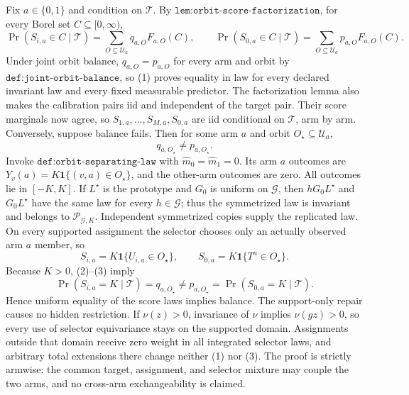 Fix \(a\in\{0,1\}\) and condition on \(\mathcal T\). By \(\texttt{lem:orbit-score-factorization}\), for every Borel set \(C\subseteq[0,\infty)\), \[\Pr(S_{i,a}\in C\mid\mathcal T)=\sum_{O\subseteq\mathcal U_a}q_{a,O}F_{a,O}(C),\qquad \Pr(S_{0,a}\in C\mid\mathcal T)=\sum_{O\subseteq\mathcal U_a}p_{a,O}F_{a,O}(C).\tag{1}\] Under joint orbit balance, \(q_{a,O}=p_{a,O}\) for every arm and orbit by \(\texttt{def:joint-orbit-balance}\), so (1) proves equality in law for every declared invariant law and every fixed measurable predictor. The factorization lemma also makes the calibration pairs iid and independent of the target pair. Their score marginals now agree, so \(S_{1,a},\ldots,S_{M,a},S_{0,a}\) are iid conditional on \(\mathcal T\), arm by arm.
Conversely, suppose balance fails. Then for some arm \(a\) and orbit \(O_\star\subseteq\mathcal U_a\), \[q_{a,O_\star}\ne p_{a,O_\star}.\tag{2}\] Invoke \(\texttt{def:orbit-separating-law}\) with \(\widehat m_0=\widehat m_1=0\). Its arm \(a\) outcomes are \(Y_v(a)=K\mathbf 1\{(v,a)\in O_\star\}\), and the other-arm outcomes are zero. All outcomes lie in \([-K,K]\). If \(L^\star\) is the prototype and \(G_0\) is uniform on \(\mathcal G\), then \(hG_0L^\star\) and \(G_0L^\star\) have the same law for every \(h\in\mathcal G\); thus the symmetrized law is invariant and belongs to \(\mathcal P_{\mathcal G,K}\). Independent symmetrized copies supply the replicated law. On every supported assignment the selector chooses only an actually observed arm \(a\) member, so \[S_{i,a}=K\mathbf 1\{U_{i,a}\in O_\star\},\qquad S_{0,a}=K\mathbf 1\{T^a\in O_\star\}.\tag{3}\] Because \(K>0\), (2)--(3) imply \[\Pr(S_{i,a}=K\mid\mathcal T)=q_{a,O_\star}\ne p_{a,O_\star}=\Pr(S_{0,a}=K\mid\mathcal T).\] Hence uniform equality of the score laws implies balance.
The support-only repair causes no hidden restriction. If \(\nu(z)>0\), invariance of \(\nu\) implies \(\nu(gz)>0\), so every use of selector equivariance stays on the supported domain. Assignments outside that domain receive zero weight in all integrated selector laws, and arbitrary total extensions there change neither (1) nor (3). The proof is strictly armwise: the common target, assignment, and selector mixture may couple the two arms, and no cross-arm exchangeability is claimed.